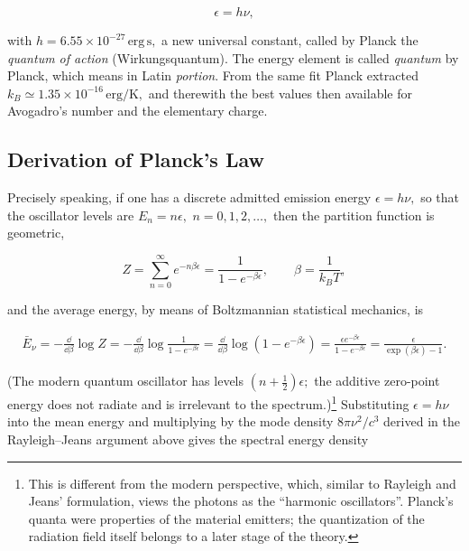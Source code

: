\begin{linenomath}
    \begin{equation}
        \epsilon=h\nu,
    \end{equation}
\end{linenomath}
with $h=6.55\times10^{-27}\,\mathrm{erg\,s},$ a new universal constant, called by Planck the \emph{quantum of action} (Wirkungsquantum). The energy element is called \textit{quantum} by Planck, which means in Latin \textit{portion}. From the same fit Planck extracted $k_B\simeq1.35\times10^{-16}\,\mathrm{erg/K},$ and therewith the best values then available for Avogadro's number and the elementary charge.

\subsection*{Derivation of Planck's Law}
Precisely speaking, if one has a discrete admitted emission energy $\epsilon=h\nu,$ so that the oscillator levels are $E_n=n\epsilon,$ $n=0,1,2,\dots,$ then the partition function is geometric,
\begin{linenomath}
    \begin{equation}
        Z=\sum_{n=0}^{\infty}e^{-n\beta\epsilon}=\frac{1}{1-e^{-\beta\epsilon}},
        \qquad \beta=\frac{1}{k_BT},
    \end{equation}
\end{linenomath}
and the average energy, by means of Boltzmannian statistical mechanics, is
\begin{linenomath}
    \begin{align}
        \bar{E}_\nu
        =-\frac{\dd}{\dd \beta}\log Z
        =-\frac{\dd}{\dd\beta}\log\frac{1}{1-e^{-\beta\epsilon}}
        =\frac{\dd}{\dd\beta}\log(1-e^{-\beta\epsilon})
        =\frac{\epsilon e^{-\beta\epsilon}}{1-e^{-\beta\epsilon}}
        =\frac{\epsilon}{\exp(\beta \epsilon) - 1}.
    \end{align}
\end{linenomath}
(The modern quantum oscillator has levels $(n+\tfrac12)\epsilon;$ the additive zero-point energy does not radiate and is irrelevant to the spectrum.)\footnote{This is different from the modern perspective, which, similar to Rayleigh and Jeans' formulation, views the photons as the ``harmonic oscillators''. Planck's quanta were properties of the material emitters; the quantization of the radiation field itself belongs to a later stage of the theory.} Substituting $\epsilon=h\nu$ into the mean energy and multiplying by the mode density $8\pi\nu^2/c^3$ derived in the Rayleigh--Jeans argument above gives the spectral energy density
